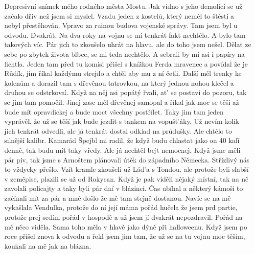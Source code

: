 
Depresivní snímek mého rodného města Mostu. Jak vidno s jeho demolicí
se už začalo dřív než jsem si myslel. Vzadu jeden z kostelů, který
neměl to štěstí a nebyl přestěhován. Vpravo za ruinou budova vojenské
správy. Tam jsem byl u odvodu. Dvakrát. Na dva roky na vojnu se mi
tenkrát fakt nechtělo. A bylo tam takových víc. Pár jich to zkoušelo
uhrát na hlavu, ale do toho jsem nešel. Dělat ze sebe po zbytek života
blbce, se mi teda nechtělo. A sebrali by mi asi i papíry na fichtla.
Jeden tam před tu komisi přišel s knížkou Ferda mravenec a povídal že
je Růdík, jim říkal každýmu strejdo a chtěl aby mu z ní četli. Další
měl trenky ke kolenům a dorazil tam s dřevěnou tatrovkou, na který
jednou nohou klečel a druhou se odstrkoval. Když na něj asi popátý
řvali, at' se postaví do pozoru, tak se jim tam pomočil. Jinej zase
měl dřevěnej samopal a říkal jak moc se těší až bude mít opravdickej a
bude moct všechny postřílet. Taky jim tam jeden vyprávěl, že už se
těší jak bude jezdit s tankem na vopušt'áky. Už nevím kolik jich
tenkrát odvedli, ale já tenkrát dostal odklad na průdušky. Ale chtělo
to silnější kalibr. Kamarád Špejbl mi radil, že když budu chlastat
jako on 40 kafí denně, tak budu mít taky vředy. Ale já nechtěl bejt
nemocnej. Když jsme měli pár piv, tak jsme s Arnoštem plánovali útěk
do západního Německa. Střízlivý nás to vždycky přešlo. Vzít kramle
zkoušeli už Lád'a s Tondou, ale protože byli slabší v zeměpise,
plazili se už od Rokycan. Když je pak viděli nějaký místní, tak na
ně zavolali policajty a taky byli pár dní v blázinci. Čas ubíhal a
některý kámoši to začínali mít za pár a mně došlo že mě tam stejně
dostanou. Navíc se na mě vykašlala Vendulka, protože do ní její
máma pořád hučela že jsem prd partie, protože prej sedím pořád v
hospodě a už jsem jí dvakrát nepozdravil. Pořád na mě něco viděla.
Sama toho měla v hlavě jako dýně při halloweenu. Když jsem po roce
přišel znova k odvodu a řekl jsem jim tam, že už se na tu vojnu
moc těšim, koukali na mě jak na blázna.

